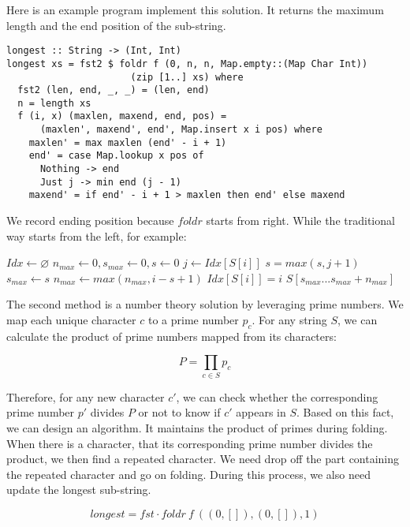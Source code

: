 \documentclass[UTF8]{article}
\begin{document}
\begin{enumerate}
Here is an example program implement this solution. It returns the maximum length and the end position of the sub-string.

\lstset{frame=single}
\begin{lstlisting}
longest :: String -> (Int, Int)
longest xs = fst2 $ foldr f (0, n, n, Map.empty::(Map Char Int))
                      (zip [1..] xs) where
  fst2 (len, end, _, _) = (len, end)
  n = length xs
  f (i, x) (maxlen, maxend, end, pos) =
      (maxlen', maxend', end', Map.insert x i pos) where
    maxlen' = max maxlen (end' - i + 1)
    end' = case Map.lookup x pos of
      Nothing -> end
      Just j -> min end (j - 1)
    maxend' = if end' - i + 1 > maxlen then end' else maxend
\end{lstlisting}

We record ending position because $foldr$ starts from right. While the traditional way starts from the left, for example:

\begin{algorithmic}
  \State $Idx \gets \varnothing$
  \State $n_{max} \gets 0, s_{max} \gets 0, s \gets 0$
      \State $j \gets Idx[S[i]]$
      \State $s = max(s, j + 1)$
    \EndIf
      \State $s_{max} \gets s$
    \EndIf
    \State $n_{max} \gets max(n_{max}, i - s + 1)$
    \State $Idx[S[i]] = i$
  \EndFor
  \State \Return $S[s_{max} ... s_{max} + n_{max}]$
\EndFunction
\end{algorithmic}

The second method is a number theory solution by leveraging prime numbers. We map each unique character $c$ to a prime number $p_c$. For any string $S$, we can calculate the product of prime numbers mapped from its characters:

\[
P = \displaystyle \prod_{c \in S} p_c
\]

Therefore, for any new character $c'$, we can check whether the corresponding prime number $p'$ divides $P$ or not to know if $c'$ appears in $S$. Based on this fact, we can design an algorithm. It maintains the product of primes during folding. When there is a character, that its corresponding prime number divides the product, we then find a repeated character. We need drop off the part containing the repeated character and go on folding. During this process, we also need update the longest sub-string.

\[
longest = fst \cdot foldr\ f\ ((0, []), (0, []), 1)
\]


\end{enumerate}
\end{document}
